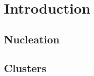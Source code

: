 
\part{Introduction}
\label{sec:introduction}

\chapter{Nucleation}
\label{sec:nucleation}

\chapter{Clusters}
\label{sec:clusters}
